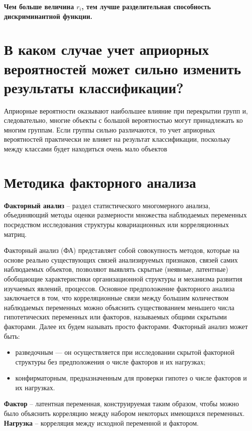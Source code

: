\documentclass[a4paper, 12pt]{article}
\begin{document}
\textbf{Чем больше величина  $r_i$, тем лучше разделительная способность дискриминантной функции.}

\section{В каком случае учет априорных вероятностей может сильно изменить результаты классификации?}
Априорные вероятности оказывают наибольшее влияние при перекрытии групп и, следовательно, многие объекты с большой вероятностью могут принадлежать ко многим группам. Если группы сильно различаются, то учет априорных вероятностей практически не влияет на результат классификации, поскольку между классами будет находиться очень мало объектов
\section{Методика факторного анализа}

\textbf{Факторный анализ} -- раздел статистического многомерного анализа, объединяющий методы оценки размерности множества наблюдаемых переменных посредством исследования структуры ковариационных или корреляционных матриц.

Факторный анализ (ФА) представляет собой совокупность методов, которые на основе реально существующих связей анализируемых признаков, связей самих наблюдаемых объектов, позволяют выявлять скрытые (неявные, латентные) обобщающие характеристики организационной структуры и механизма развития изучаемых явлений, процессов. Основное предположение факторного анализа заключается в том, что корреляционные связи между большим количеством наблюдаемых переменных можно объяснить существованием меньшего числа гипотетических переменных или факторов, называемых общими скрытыми факторами. Далее их будем называть просто факторами.
Факторный анализ может быть:
\begin{itemize}
    \item разведочным — он осуществляется при исследовании скрытой факторной структуры без предположения о числе факторов и их нагрузках;
    \item конфирматорным, предназначенным для проверки гипотез о числе факторов и их нагрузках.
\end{itemize}

\textbf{Фактор} – латентная переменная, конструируемая таким образом, чтобы можно было объяснить корреляцию между набором некоторых имеющихся переменных.
\textbf{Нагрузка} – корреляция между исходной переменной и фактором.
\end{document}
